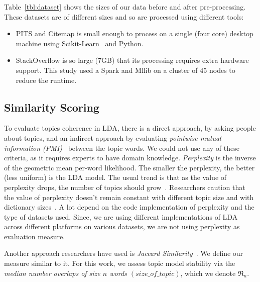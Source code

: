 \documentclass[twocolumn,5p,sort&compress]{elsarticle}
\newcommand{\bi}{\begin{itemize}}
\newcommand{\ei}{\end{itemize}}
\theoremstyle{break}
\begin{document}
  Table~\ref{tbl:dataset} shows the sizes of our data before and after pre-processing.
  These datasets are of different sizes and so are processed using different tools:
  \bi
\item PITS and Citemap is small enough to process on a single (four core) desktop machine
  using Scikit-Learn~\cite{pedregosa2011scikit} and Python.
  \item StackOverflow is so large (7GB) that its  processing requires extra hardware support.
 This study used a Spark and Mllib on a cluster of 45 nodes to
 reduce the runtime.
 \ei
  




\subsection{Similarity Scoring}
To evaluate topics coherence in LDA, there is a direct approach, by asking people about topics, and an indirect approach by evaluating \textit{pointwise mutual information (PMI)}~\cite{lau2014machine, o2015analysis} between the topic words. We could not use any of these criteria, as it requires experts to have domain knowledge. \textit{Perplexity} is  the inverse of the geometric mean per-word likelihood. The smaller the perplexity, the better (less uniform) is the LDA model. The usual trend is that as the value of perplexity drops, the number of topics should grow~\cite{koltcov2014latent}. Researchers caution that the value of perplexity doesn't remain constant with different topic size and with dictionary sizes~\cite{koltcov2014latent, zhao2015heuristic}. A lot depend on the code implementation of perplexity and the type of datasets used. Since, we are using different implementations of LDA across different platforms on various datasets, we are not using perplexity as evaluation measure.

Another approach researchers have used is \textit{Jaccard Similarity}~\cite{o2015analysis, galvis2013analysis}. We define our measure similar to it. For this work, we assess topic model stability via the {\em median number overlaps of size $n$ words $\mathit{(size\_of\_topic)}$}, which we denote  $\Re_n$.
\end{document}
